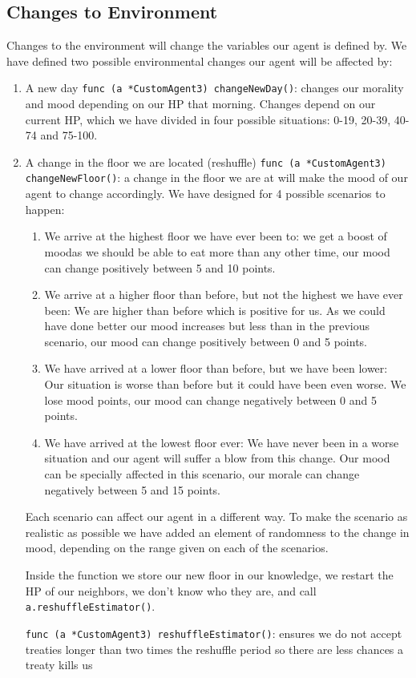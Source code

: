 \subsection{Changes to Environment}
Changes to the environment will change the variables our agent is defined by. We have defined two possible environmental changes our agent will be affected by:
\begin{enumerate}
    \item A new day \texttt{func (a *CustomAgent3) changeNewDay()}: changes our morality and mood depending on our HP that morning. Changes depend on our current HP, which we have divided in four possible situations: 0-19, 20-39, 40-74 and 75-100.
    \item A change in the floor we are located (reshuffle) \texttt{func (a *CustomAgent3) changeNewFloor()}: a change in the floor we are at will make the mood of our agent to change accordingly. We have designed for 4 possible scenarios to happen: 
    \begin{enumerate}
        \item We arrive at the highest floor we have ever been to: we get a boost of moodas we should be able to eat more than any other time, our mood can change positively between 5 and 10 points.
        \item We arrive at a higher floor than before, but not the highest we have ever been: We are higher than before which is positive for us. As we could have done better our mood increases but less than in the previous scenario, our mood can change positively between 0 and 5 points.
        \item We have arrived at a lower floor than before, but we have been lower: Our situation is worse than before but it could have been even worse. We lose mood points, our mood can change negatively between 0 and 5 points.
        \item We have arrived at the lowest floor ever: We have never been in a worse situation and our agent will suffer a blow from this change. Our mood can be specially affected in this scenario, our morale can change negatively between 5 and 15 points.
    \end{enumerate}
    Each scenario can affect our agent in a different way. To make the scenario as realistic as possible we have added an element of randomness to the change in mood, depending on the range given on each of the scenarios. \par
    Inside the function we store our new floor in our knowledge, we restart the HP of our neighbors, we don’t know who they are, and call \texttt{a.reshuffleEstimator()}. \par
    \texttt{func (a *CustomAgent3) reshuffleEstimator()}: ensures we do not accept treaties longer than two times the reshuffle period so there are less chances a treaty kills us 
\end{enumerate}

